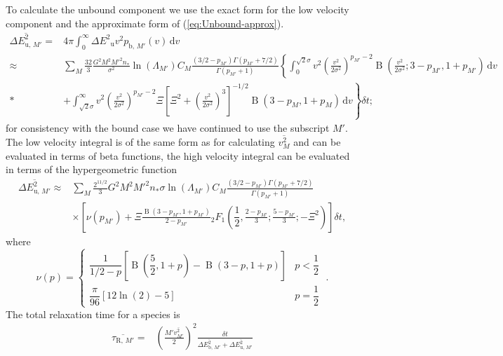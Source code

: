 \documentclass[useAMS,usedcolumn,usegraphicx,usenatbib]{mn2e}
\newcommand{\eqnref}[1]{(\ref{eq:#1})}
\DeclareMathOperator{\Beta}{B}
\newcommand{\sub}[1]{\ensuremath{_\mathrm{#1}}}
\newcommand{\dd}{\ensuremath{\mathrm{d}}}
\newcommand{\intd}[4]{\ensuremath{\displaystyle \int_{#1}^{#2}{#3}\,\dd{#4}}}
\newcommand{\recip}[1]{\ensuremath{\dfrac{1}{#1}}}
\begin{document}
\begin{onecolumn}
To calculate the unbound component we use the exact form for the low velocity component and the approximate form of \eqnref{Unbound-approx}. 
\begin{align}
\overline{\Delta E^2_{\mathrm{u},\,M'}} = {} & 4\pi\intd{0}{\infty}{\Delta E^2\sub{u} v^2 p_{\mathrm{b},\,M'}(v)}{v} \\
 \approx {} & \sum_M\frac{32}{3}\frac{G^2M^2{M'}^2n_\ast}{\sigma^2}\ln\left(\Lambda_{M'}\right) C_M \frac{(3/2 - p_{M'})\Gamma(p_{M'} + 7/2)}{\Gamma(p_{M'} + 1)} \left\{ \intd{0}{\sqrt{2}\sigma}{v^2\left(\frac{v^2}{2\sigma^2}\right)^{p_{M'}-2}\Beta\left(\frac{v^2}{2\sigma^2};3-p_{M'},1+p_{M'}\right)}{v} \right. \nonumber \\* 
 {} & + \left. \intd{\sqrt{2}\sigma}{\infty}{v^2\left(\frac{v^2}{2\sigma^2}\right)^{p_{M'}-2} \Xi\left[\Xi^2 + \left(\frac{v^2}{2\sigma^2}\right)^3\right]^{-1/2} \Beta\left(3-p_M,1+p_M\right)}{v} \right\} \delta t;
\end{align}
for consistency with the bound case we have continued to use the subscript $M'$. The low velocity integral is of the same form as for calculating $\overline{v^2_M}$ and can be evaluated in terms of beta functions, the high velocity integral can be evaluated in terms of the hypergeometric function \citep[15.6.1]{Olver2010}
\begin{align}
\overline{\Delta E^2_{\mathrm{u},\,M'}} \approx {} & \sum_M\frac{2^{11/2}}{3}G^2M^2{M'}^2n_\ast\sigma\ln\left(\Lambda_{M'}\right) C_M \frac{(3/2 - p_{M'})\Gamma(p_{M'} + 7/2)}{\Gamma(p_{M'} + 1)} \nonumber \\
  & \times \left[\nu\left(p_{M'}\right) + \Xi\frac{\Beta\left(3-p_{M'},1+p_{M'}\right)}{2-p_{M'}}{_2F_1}\left(\recip{2},\frac{2-p_{M'}}{3};\frac{5-p_{M'}}{3};-\Xi^2\right) \right] \delta t,
\end{align}
where
\begin{equation}
\nu(p) = \begin{cases} \recip{1/2 - p}\left[\Beta\left(\dfrac{5}{2},1+p\right) - \Beta\left(3-p,1+p\right)\right] & p < \recip{2} \\
\dfrac{\pi}{96}\left[12 \ln(2) - 5\right] & p = \recip{2}
\end{cases} \; .
\end{equation}
The total relaxation time for a species is
\begin{align}
\overline{\tau_{\mathrm{R,}\,M'}} = {} & \left(\frac{{M'}\overline{v_{M'}^2}}{2}\right)^2\frac{\delta t}{\overline{\Delta E^2_{\mathrm{b},\,M'}} + \overline{\Delta E^2_{\mathrm{u},\,M'}}} \\

\end{align}
\end{onecolumn}
\end{document}
